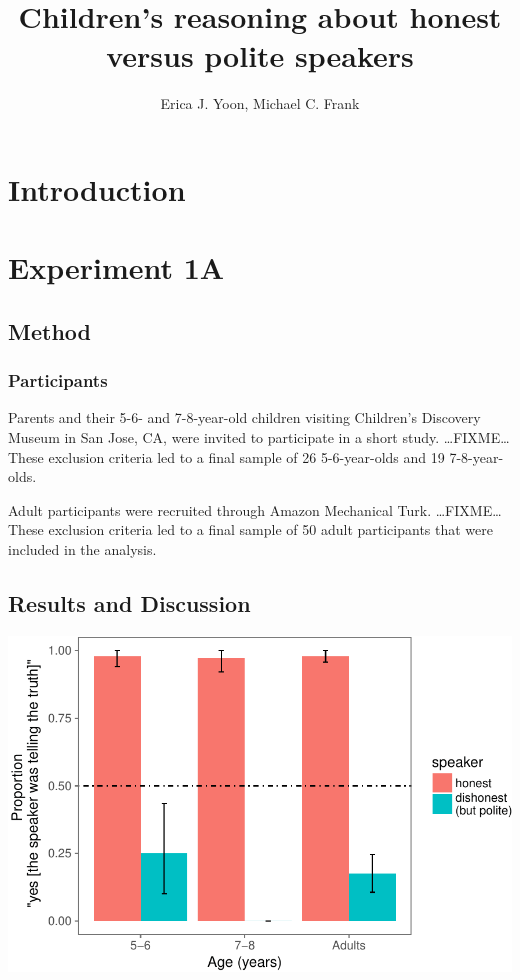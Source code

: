 \documentclass[a4paper,man,apacite,floatsintext]{apa6}
\date{}
\title{\textbf{Children's reasoning about honest versus polite speakers}}
\author{Erica J. Yoon, Michael C. Frank}
\affiliation{Department of Psychology, Stanford University}
\newenvironment{CodeChunk}{}{}
\begin{document}
\maketitle

\section{Introduction}\label{introduction}

\section{Experiment 1A}\label{experiment-1a}

\subsection{Method}\label{method}

\subsubsection{Participants}\label{participants}

Parents and their 5-6- and 7-8-year-old children visiting Children's
Discovery Museum in San Jose, CA, were invited to participate in a short
study. \ldots{}FIXME\ldots{} These exclusion criteria led to a final
sample of 26 5-6-year-olds and 19 7-8-year-olds.

Adult participants were recruited through Amazon Mechanical Turk.
\ldots{}FIXME\ldots{} These exclusion criteria led to a final sample of
50 adult participants that were included in the analysis.

\subsection{Results and Discussion}\label{results-and-discussion}

\begin{CodeChunk}

\includegraphics{figs/unnamed-chunk-1-1} \end{CodeChunk}
\end{document}
